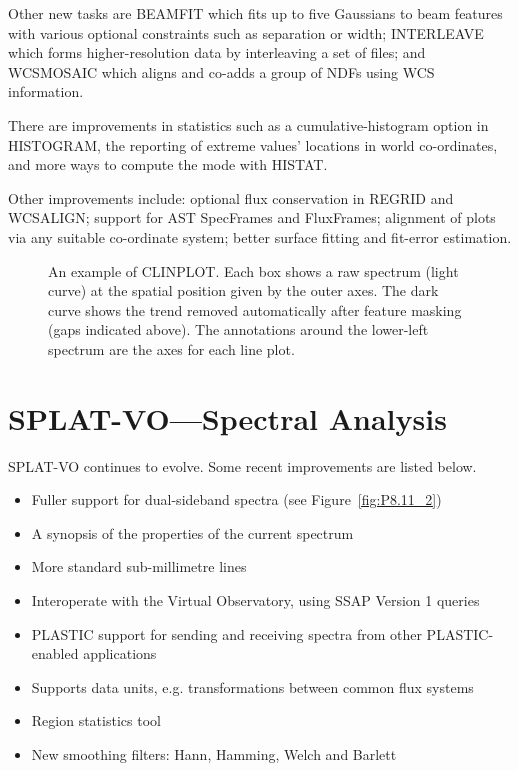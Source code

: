 \documentclass[11pt,twoside]{article}  %
\begin{document}
Other new tasks are {\footnotesize BEAMFIT} which fits up to five
Gaussians to beam features with various optional constraints such as
separation or width; {\footnotesize INTERLEAVE} which forms
higher-resolution data by interleaving a set of files; and
{\footnotesize WCSMOSAIC} which aligns and co-adds a group of NDFs
using WCS information.

There are improvements in statistics such as a cumulative-histogram 
option in {\footnotesize HISTOGRAM}, the reporting of extreme values'
locations in world co-ordinates, and more ways to compute the mode 
with {\footnotesize HISTAT}.

Other improvements include: optional flux conservation in
{\footnotesize REGRID} and {\footnotesize WCSALIGN}; support for AST
SpecFrames and FluxFrames; alignment of plots via any suitable
co-ordinate system; better surface fitting and fit-error estimation.

\begin{figure}
\caption{An example of {\footnotesize CLINPLOT}.  Each box shows a raw
spectrum (light curve) at the spatial position given by the outer
axes. The dark curve shows the trend removed automatically after
feature masking (gaps indicated above).  The annotations around the
lower-left spectrum are the axes for each line plot.}
\label{fig:P8.11_1}
\end{figure}

\section{SPLAT-VO---Spectral Analysis}

SPLAT-VO continues to evolve.  Some recent improvements are listed below.
\begin{itemize}
\item Fuller support for dual-sideband spectra (see Figure~\ref{fig:P8.11_2})
\item A synopsis of the properties of the current spectrum
\item More standard sub-millimetre lines
\item Interoperate with the Virtual Observatory, using SSAP Version 1 queries
\item PLASTIC support for sending and receiving spectra from other
   PLASTIC-enabled applications
\item Supports data units, e.g. transformations between common
   flux systems
\item Region statistics tool
\item New smoothing filters: Hann, Hamming, Welch and Barlett
\end{itemize}
\end{document}
